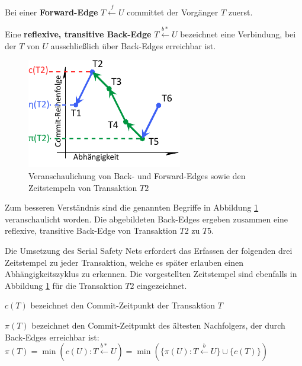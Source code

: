 \begin{Definition}
	Bei einer \textcolor{my-blue}{\textbf{Forward-Edge}} $T\xleftarrow{f} U$ committet der Vorgänger $T$ zuerst.
\end{Definition}

\begin{Definition}
	Eine \textcolor{my-green}{\textbf{reflexive, transitive Back-Edge}} $T\xleftarrow{b*} U$ bezeichnet eine Verbindung, bei der $T$ von $U$ ausschließlich über Back-Edges erreichbar ist.
\end{Definition}

\begin{figure}
	\includegraphics[width=0.8\columnwidth]{img/Figure_2_1.pdf}
	\caption{Veranschaulichung von \textcolor{my-green}{Back}- und \textcolor{my-blue}{Forward-Edges} sowie den Zeitstempeln von Transaktion $T2$}
	\label{fig:back_forward}
\end{figure}

Zum besseren Verständnis sind die genannten Begriffe in Abbildung \ref{fig:back_forward} veranschaulicht worden.
Die abgebildeten Back-Edges ergeben zusammen eine reflexive, transitive Back-Edge von Transaktion $T2$ zu $T5$.

Die Umsetzung des Serial Safety Nets erfordert das Erfassen der folgenden drei Zeitstempel zu jeder Transaktion, welche es später erlauben einen Abhängigkeitszyklus zu erkennen.
Die vorgestellten Zeitstempel sind ebenfalls in Abbildung \ref{fig:back_forward} für die Transaktion $T2$ eingezeichnet.

\begin{Definition}
	\textcolor{my-red}{$c(T)$} bezeichnet den Commit-Zeitpunkt der Transaktion $T$
\end{Definition}

\begin{Definition}
	\textcolor{my-green}{$\pi (T)$} bezeichnet den Commit-Zeitpunkt des ältesten Nachfolgers, der durch Back-Edges erreichbar ist:\\		
	$\pi (T)=\min (c(U):T\xleftarrow{b*}U)=\min (\{\pi (U):T\xleftarrow{b}U\}\cup \{c(T)\})$
\end{Definition}

